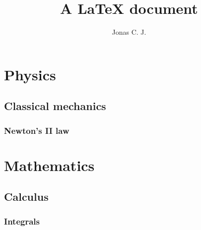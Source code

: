 \documentclass[a4paper, 12pt]{article}
\title{A \LaTeX{} document}
\author{Jonas C. J.}
\begin{document}
\maketitle

\newpage
\tableofcontents
\newpage

\section{Physics}
\subsection{Classical mechanics}
\lipsum[1-3]
\subsubsection{Newton's II law}
\lipsum[1]

\section{Mathematics}

\subsection{Calculus}
\lipsum[1-5]

\subsubsection{Integrals}
\end{document}
